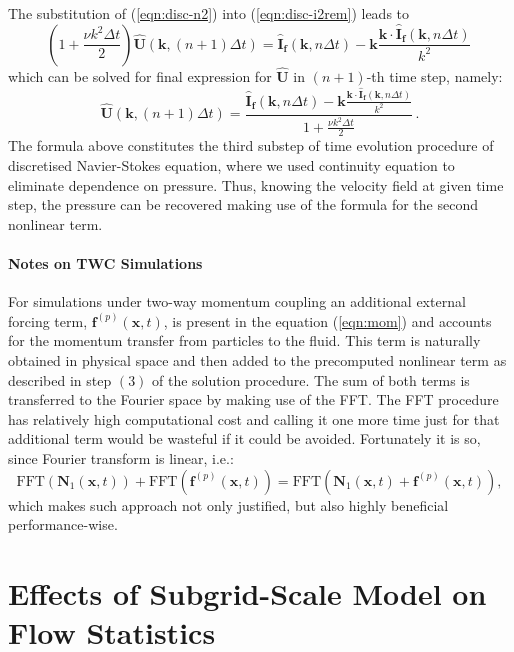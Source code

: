 \documentclass{pracamgren}
\begin{document}
\begin{enumerate}
The substitution of (\ref{eqn:disc-n2}) into (\ref{eqn:disc-i2rem}) leads to
$$ \left( 1 + \frac{\nu k^2 \Delta t}{2} \right) \mathbf{\hat{U}}(\mathbf{k}, (n+1) \Delta t) = \mathbf{\hat{I}_f}(\mathbf{k}, n \Delta t) - \mathbf{k} \frac{\mathbf{k} \cdot \mathbf{\hat{I}_f}(\mathbf{k}, n \Delta t)}{k^2} \, $$
which can be solved for final expression for $\mathbf{\hat{U}}$ in $(n+1)$-th time step, namely:
\begin{equation}
\mathbf{\hat{U}}(\mathbf{k}, (n+1) \Delta t) = \frac{\mathbf{\hat{I}_f}(\mathbf{k}, n \Delta t) - \mathbf{k} \frac{\mathbf{k} \cdot \mathbf{\hat{I}_f}(\mathbf{k}, n \Delta t)}{k^2}}{1 + \frac{\nu k^2 \Delta t}{2}} \, .
\end{equation}
The formula above constitutes the third substep of time evolution procedure of discretised Navier-Stokes equation, where we used continuity equation to eliminate dependence on pressure.
Thus, knowing the velocity field at given time step, the pressure can be recovered making use of the formula for the second nonlinear term.
\end{enumerate}

\subsubsection{Notes on TWC Simulations}

For simulations under two-way momentum coupling an additional external forcing term, $\mathbf{f}^{(p)}(\mathbf{x},t)$, is present in the equation (\ref{eqn:mom}) and accounts for the momentum transfer from particles to the fluid.
This term is naturally obtained in physical space and then added to the precomputed nonlinear term as described in step $(3)$ of the solution procedure.
The sum of both terms is transferred to the Fourier space by making use of the FFT.
The FFT procedure has relatively high computational cost and calling it one more time just for that additional term would be wasteful if it could be avoided.
Fortunately it is so, since Fourier transform is linear, i.e.:
$$\text{FFT}(\textbf{N}_1 (\mathbf{x},t)) + \text{FFT}(\textbf{f}^{(p)} (\mathbf{x},t)) = \text{FFT}(\textbf{N}_1 (\mathbf{x},t) +  \textbf{f}^{(p)} (\mathbf{x},t)), $$
which makes such approach not only justified, but also highly beneficial performance-wise.



\chapter{Effects of Subgrid-Scale Model on Flow Statistics}
\label{app:sgs}
\end{document}
